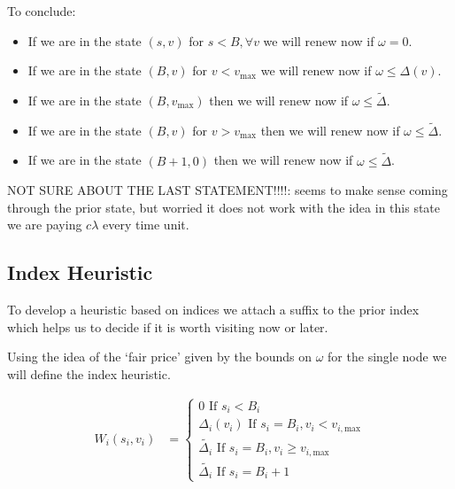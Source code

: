 \documentclass[a4paper,10pt]{article}
\theoremstyle{definition}
\theoremstyle{definition}
\theoremstyle{remark}
\theoremstyle{definition}
\begin{document}
To conclude:
\begin{itemize}
\item If we are in the state $(s,v)$ for $s < B , \forall v$ we will renew now if $\omega=0$.
\item If we are in the state $(B,v)$ for $v < v_{\text{max}}$ we will renew now if $\omega \leq \Delta(v)$.
\item If we are in the state $(B,v_{\text{max}})$ then we will renew now if $\omega \leq \widetilde{\Delta}$.
\item If we are in the state $(B,v)$ for $v > v_{\text{max}}$ then we will renew now if $\omega \leq \widetilde{\Delta}$.
\item If we are in the state $(B+1,0)$ then we will renew now if $\omega \leq \widetilde{\Delta}$.
\end{itemize}

NOT SURE ABOUT THE LAST STATEMENT!!!!: seems to make sense coming through the prior state, but worried it does not work with the idea in this state we are paying $c \lambda$ every time unit.


\subsection{Index Heuristic}
To develop a heuristic based on indices we attach a suffix to the prior index which helps us to decide if it is worth visiting now or later.

Using the idea of the `fair price' given by the bounds on $\omega$ for the single node we will define the index heuristic.

\begin{align}
W_{i}(s_{i},v_{i})&=\begin{cases}
0 \text{ If } s_{i}<B_{i} \\
\Delta_{i}(v_{i}) \text{ If } s_{i}=B_{i} , v_{i}<v_{i,\text{max}} \\
\widetilde{\Delta_{i}} \text{ If } s_{i}=B_{i} , v_{i} \geq v_{i,\text{max}} \\
\widetilde{\Delta_{i}} \text{ If } s_{i}=B_{i}+1
\end{cases}
\end{align}
\end{document}
